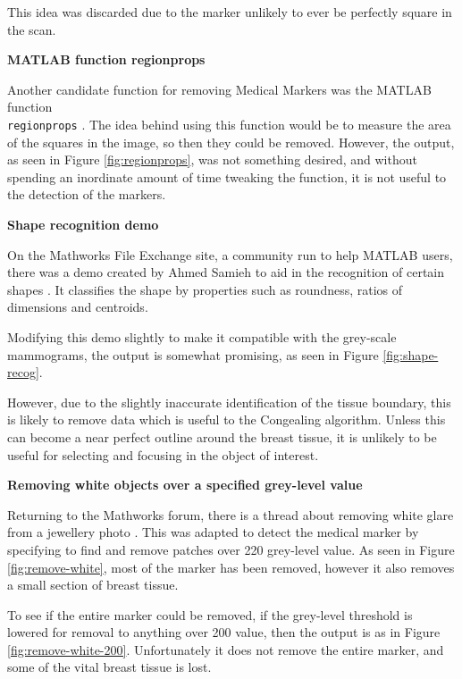 This idea was discarded due to the marker unlikely to ever be perfectly square in the scan.

\noindent \textbf{MATLAB function regionprops}

Another candidate function for removing Medical Markers was the MATLAB function \\ \texttt{regionprops} \cite{regionprops}. The idea behind using this function would be to measure the area of the squares in the image, so then they could be removed. However, the output, as seen in Figure \ref{fig:regionprops}, was not something desired, and without spending an inordinate amount of time tweaking the function, it is not useful to the detection of the markers.

\vspace{2cm}
\noindent \textbf{Shape recognition demo}

On the Mathworks File Exchange site, a community run to help MATLAB users, there was a demo created by Ahmed Samieh to aid in the recognition of certain shapes \cite{shape_recognition}. It classifies the shape by properties such as roundness, ratios of dimensions and centroids.

Modifying this demo slightly to make it compatible with the grey-scale mammograms, the output is somewhat promising, as seen in Figure \ref{fig:shape-recog}.

However, due to the slightly inaccurate identification of the tissue boundary, this is likely to remove data which is useful to the \Gls{Congealing} algorithm. Unless this can become a near perfect outline around the breast tissue, it is unlikely to be useful for selecting and focusing in the object of interest.

\noindent  \textbf{Removing white objects over a specified grey-level value}

Returning to the Mathworks forum, there is a thread about removing white glare from a jewellery photo \cite{remove_white}. This was adapted to detect the medical marker by specifying to find and remove patches over 220 grey-level value. As seen in Figure \ref{fig:remove-white}, most of the marker has been removed, however it also removes a small section of breast tissue.

To see if the entire marker could be removed, if the grey-level threshold is lowered for removal to anything over 200 value, then the output is as in Figure \ref{fig:remove-white-200}. Unfortunately it does not remove the entire marker, and some of the vital breast tissue is lost.


